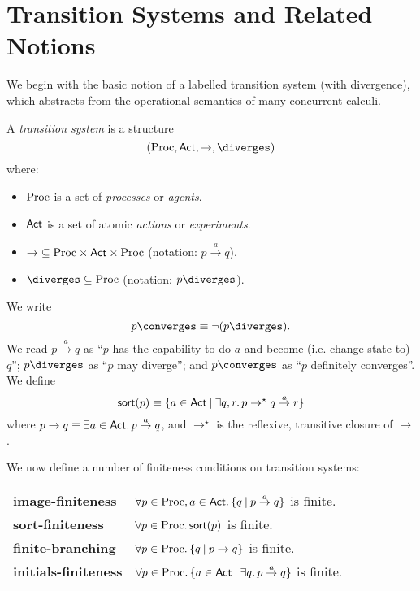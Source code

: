 \section{Transition Systems and Related Notions}

We begin with the basic notion of a labelled transition system (with divergence), which abstracts from the operational semantics of many concurrent calculi.

\begin{definition}
{\rm A {\em transition system} is a structure
\[ ({\rm Proc}, {\sf Act}, \rightarrow, \diverges ) \]
where:
\begin{itemize}

\item ${\rm Proc}$ is a set of {\em processes} or {\em agents}.

\item ${\sf Act}$ is a set of atomic {\em actions} or {\em experiments}.

\item ${\rightarrow} \subseteq {\rm Proc} \times {\sf Act} \times {\rm Proc}$ (notation: $p \stackrel{a}{\rightarrow} q$).

\item $\diverges \subseteq {\rm Proc}$ (notation: $p \diverges$).
\end{itemize}}
\end{definition}

We write
\[ p \converges \equiv \neg (p \diverges ) . \]
We read $p \stackrel{a}{\rightarrow} q$ as ``$p$ has the capability to do $a$ and become (i.e. change state to) $q$''; $p \diverges$ as ``$p$ may diverge''; and $p \converges$ as ``$p$ definitely converges''.
We define
\[ {\sf sort}(p) \equiv \{ a \in {\sf Act} \: | \: \exists q, r . \, p \rightarrow^{\star} q \stackrel{a}{\rightarrow} r \} \]
where $p \rightarrow q \equiv \exists a \in {\sf Act} . \, p \stackrel{a}{\rightarrow} q$, and $\rightarrow^{\star}$ is the reflexive, transitive closure of $\rightarrow$.

We now define a number of finiteness conditions on transition systems:
\begin{center}
\begin{tabular}{ll}
{\bf image-finiteness} & $\forall p \in {\rm Proc} , a \in {\sf Act} . \, \{ q \: | \: p \stackrel{a}{\rightarrow} q \}$ is finite. \\
{\bf sort-finiteness} & $\forall p \in {\rm Proc} . \, {\sf sort}(p)$ is finite. \\
{\bf finite-branching} & $\forall p \in {\rm Proc} . \, \{ q \: | \: p \rightarrow q \}$ is finite. \\
{\bf initials-finiteness} & $\forall p \in {\rm Proc} . \, \{ a \in {\sf Act} \: | \: \exists q . \, p \stackrel{a}{\rightarrow} q \}$ is finite.
\end{tabular}
\end{center}

